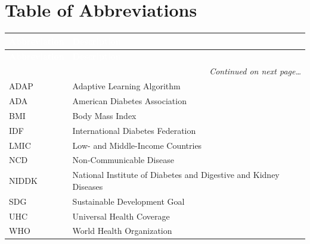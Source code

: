 \documentclass[12pt]{article}
\begin{document}
\tableofcontents
\newpage

\listoffigures
{}
\newpage

\listoftables
{}
\newpage

\section*{Table of Abbreviations}

\vspace{0.5em}
\begin{center}
\begin{longtable}{|p{3.2cm}|p{10.5cm}|}
\hline
\rowcolor{tableheader}
\textcolor{white}{\textbf{Abbreviation}} &
\textcolor{white}{\textbf{Description}} \\ \hline
\endfirsthead
\hline
\rowcolor{tableheader}
\textcolor{white}{\textbf{Abbreviation}} &
\textcolor{white}{\textbf{Description}} \\ \hline
\endhead
\hline
\multicolumn{2}{|r|}{\small\textit{Continued on next page\ldots}} \\
\endfoot
\hline
\endlastfoot
\rowcolor{tablerowlight} ADAP   & Adaptive Learning Algorithm \\ \hline
\rowcolor{tablerowwhite} ADA    & American Diabetes Association \\ \hline
\rowcolor{tablerowlight} BMI    & Body Mass Index \\ \hline
\rowcolor{tablerowwhite} IDF    & International Diabetes Federation \\ \hline
\rowcolor{tablerowlight} LMIC   & Low- and Middle-Income Countries \\ \hline
\rowcolor{tablerowwhite} NCD    & Non-Communicable Disease \\ \hline
\rowcolor{tablerowlight} NIDDK  & National Institute of Diabetes and Digestive and Kidney Diseases \\ \hline
\rowcolor{tablerowwhite} SDG    & Sustainable Development Goal \\ \hline
\rowcolor{tablerowlight} UHC    & Universal Health Coverage \\ \hline
\rowcolor{tablerowwhite} WHO    & World Health Organization \\ \hline
\end{longtable}
\end{center}
\newpage
\end{document}
